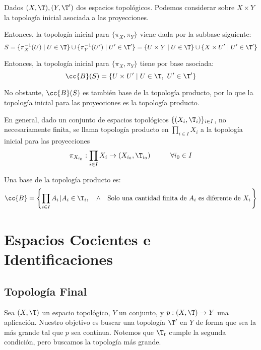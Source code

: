 \begin{ejemplo}
    Dados $(X,\T), (Y,\T')$ dos espacios topológicos. Podemos considerar sobre $X\times Y$ la topología inicial asociada a las proyecciones.

    Entonces, la topología inicial para $\{\pi_X,\pi_Y\}$ viene dada por la subbase siguiente:
    \begin{equation*}
        S = \{\pi_X^{-1}(U)\mid U\in \T\} \cup \{\pi_Y^{-1}(U')\mid U'\in \T'\}
        = \{U\times Y\mid U\in \T\} \cup \{X\times U'\mid U'\in \T'\}
    \end{equation*}

    Entonces, la topología inicial para $\{\pi_X,\pi_Y\}$ tiene por base asociada:
    \begin{equation*}
        \cc{B}(S) = \{U\times U'\mid U\in \T,~ U'\in \T'\}
    \end{equation*}

    No obstante, $\cc{B}(S)$ es también base de la topología producto, por lo que la topología inicial para las proyecciones es la topología producto.

    En general, dado un conjunto de espacios topológicos $\{(X_i,\T_i)\}_{i\in I}$, no necesariamente finita, se llama topología producto en $\prod\limits_{i\in I}X_i$ a la topología inicial para las proyecciones
    \begin{equation*}
        \pi_{X_{i_0}}: \prod_{i\in I}X_i \to (X_{i_0}, \T_{i_0}) \hspace{1cm} \forall i_0\in I
    \end{equation*}

    Una base de la topología producto es:
    \begin{equation*}
        \cc{B} = \left\{\prod_{i\in I}A_i\left| A_i\in \T_i,\quad \land \quad \text{Solo una cantidad finita de $A_i$ es diferente de $X_i$}\right.\right\}
    \end{equation*}
\end{ejemplo}




\section{Espacios Cocientes e Identificaciones}

\subsection{Topología Final}
Sea $(X,\T)$ un espacio topológico, $Y$ un conjunto, y $p:(X,\T)\to Y$ una aplicación. Nuestro objetivo es buscar una topología $\T'$ en $Y$ de forma que sea la más grande tal que $p$ sea continua. Notemos que $\T_t$ cumple la segunda condición, pero buscamos la topología más grande.

